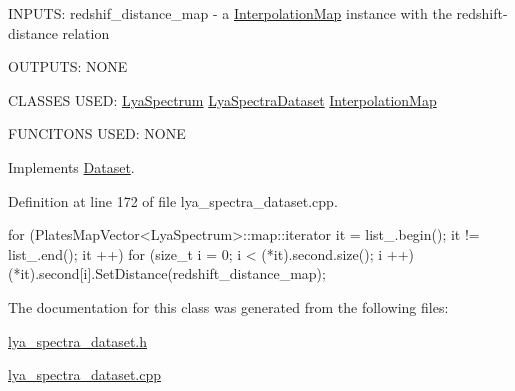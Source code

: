 I\-N\-P\-U\-T\-S\-: redshif\-\_\-distance\-\_\-map -\/ a \hyperlink{class_interpolation_map}{Interpolation\-Map} instance with the redshift-\/distance relation

O\-U\-T\-P\-U\-T\-S\-: N\-O\-N\-E

C\-L\-A\-S\-S\-E\-S U\-S\-E\-D\-: \hyperlink{class_lya_spectrum}{Lya\-Spectrum} \hyperlink{class_lya_spectra_dataset}{Lya\-Spectra\-Dataset} \hyperlink{class_interpolation_map}{Interpolation\-Map}

F\-U\-N\-C\-I\-T\-O\-N\-S U\-S\-E\-D\-: N\-O\-N\-E

Implements \hyperlink{class_dataset_a76dbae8574850da55a3b88149ccbe3f9}{Dataset}.



Definition at line 172 of file lya\-\_\-spectra\-\_\-dataset.\-cpp.


\begin{DoxyCode}
                                                                               
        {
    for (PlatesMapVector<LyaSpectrum>::map::iterator it = list_.begin(); it != 
      list_.end(); it ++){
        for (size_t i = 0; i < (*it).second.size(); i ++){
            (*it).second[i].SetDistance(redshift_distance_map);
        }
    }
    
}
\end{DoxyCode}


The documentation for this class was generated from the following files\-:\begin{DoxyCompactItemize}
\item 
\hyperlink{lya__spectra__dataset_8h}{lya\-\_\-spectra\-\_\-dataset.\-h}\item 
\hyperlink{lya__spectra__dataset_8cpp}{lya\-\_\-spectra\-\_\-dataset.\-cpp}\end{DoxyCompactItemize}
